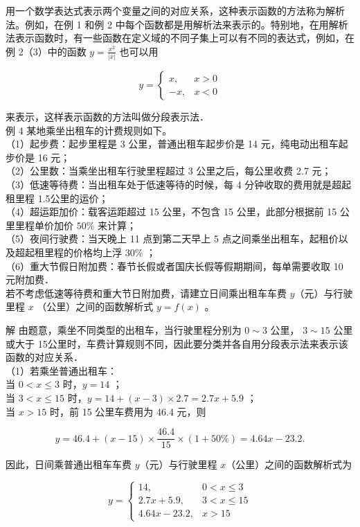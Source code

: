 \documentclass[10pt]{article}
\begin{document}
用一个数学表达式表示两个变量之间的对应关系，这种表示函数的方法称为解析法。例如，在例 1 和例 2 中每个函数都是用解析法来表示的。特别地，在用解析法表示函数时，有一些函数在定义域的不同子集上可以有不同的表达式，例如，在例 2（3）中的函数 \(y=\frac{x^{2}}{|x|}\) 也可以用

\[
y= \begin{cases}x, & x>0 \\ -x, & x<0\end{cases}
\]

来表示，这样表示函数的方法叫做分段表示法．\\
例 4 某地乘坐出租车的计费规则如下。\\
（1）起步费：起步里程是 3 公里，普通出租车起步价是 14 元，纯电动出租车起步价是 16 元；\\
（2）公里数：当乘坐出租车行驶里程超过 3 公里之后，每公里收费 2.7 元；\\
（3）低速等待费：当出租车处于低速等待的时候，每 4 分钟收取的费用就是超起租里程 1.5公里的运价；\\
（4）超运距加价：载客运距超过 15 公里，不包含 15 公里，此部分根据前 15 公里里程单价加价 \(50 \%\) 来计算；\\
（5）夜间行驶费：当天晚上 11 点到第二天早上 5 点之间乘坐出租车，起租价以及超起租里程的价格均上浮 \(30 \%\) ；\\
（6）重大节假日附加费：春节长假或者国庆长假等假期期间，每单需要收取 10 元附加费．\\
若不考虑低速等待费和重大节日附加费，请建立日间乘出租车车费 \(y\)（元）与行驶里程 \(x\) （公里）之间的函数解析式 \(y=f(x)\) 。

解 由题意，乘坐不同类型的出租车，当行驶里程分别为 \(0 \sim 3\) 公里， \(3 \sim 15\) 公里或大于 15公里时，车费计算规则不同，因此要分类并各自用分段表示法来表示该函数的对应关系．\\
（1）若乘坐普通出租车：\\
当 \(0<x \leqslant 3\) 时，\(y=14\) ；\\
当 \(3<x \leqslant 15\) 时，\(y=14+(x-3) \times 2.7=2.7 x+5.9\) ；\\
当 \(x>15\) 时，前 15 公里车费用为 46.4 元，则

\[
y=46.4+(x-15) \times \frac{46.4}{15} \times(1+50 \%)=4.64 x-23.2 .
\]

因此，日间乘普通出租车车费 \(y\)（元）与行驶里程 \(x\)（公里）之间的函数解析式为

\[
y= \begin{cases}14, & 0<x \leqslant 3 \\ 2.7 x+5.9, & 3<x \leqslant 15 \\ 4.64 x-23.2, & x>15\end{cases}
\]
\end{document}
